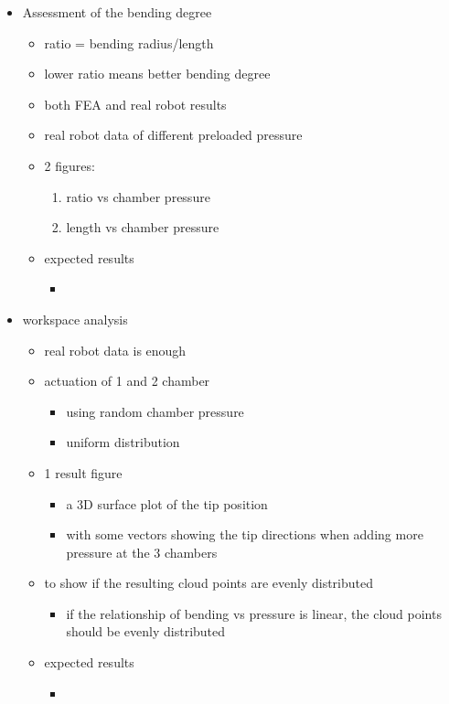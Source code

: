 \documentclass[journal,onecolumn]{IEEEtran}
\begin{document}
\begin{itemize}
\item Assessment of the bending degree
\begin{itemize}
\item ratio = bending radius/length
\item lower ratio means better bending degree
\item both FEA and real robot results
\item real robot data of different preloaded pressure
\item 2 figures:
\begin{enumerate}
\item ratio vs chamber pressure
\item length vs chamber pressure
\end{enumerate}
\item expected results
\begin{itemize}
\item 
\end{itemize}
\end{itemize}

\item workspace analysis
\begin{itemize}
\item real robot data is enough
\item actuation of 1 and 2 chamber
\begin{itemize}
\item using random chamber pressure
\item uniform distribution
\end{itemize}
\item 1 result figure
\begin{itemize}
\item a 3D surface plot of the tip position
\item with some vectors showing the tip directions when adding more pressure at the 3 chambers
\end{itemize}
\item to show if the resulting cloud points are evenly distributed
\begin{itemize}
\item if the relationship of bending vs pressure is linear, the cloud points should be evenly distributed
\end{itemize}
\item expected results
\begin{itemize}
\item 
\end{itemize}
\end{itemize}
\end{itemize}
\end{document}
